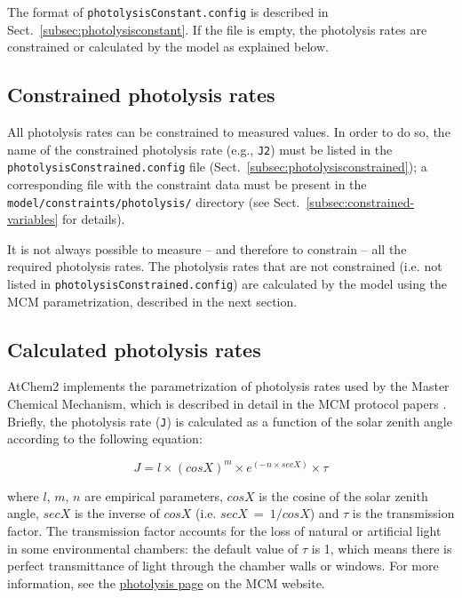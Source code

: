 The format of \texttt{photolysisConstant.config} is described in
Sect.~\ref{subsec:photolysisconstant}. If the file is empty, the
photolysis rates are constrained or calculated by the model as
explained below.

\subsection{Constrained photolysis rates} \label{subsec:constrained-photolysis-rates}

All photolysis rates can be constrained to measured values. In order
to do so, the name of the constrained photolysis rate (e.g., \texttt{J2})
must be listed in the \texttt{photolysisConstrained.config} file
(Sect.~\ref{subsec:photolysisconstrained}); a corresponding file with the
constraint data must be present in the \texttt{model/constraints/photolysis/}
directory (see Sect.~\ref{subsec:constrained-variables} for details).

It is not always possible to measure -- and therefore to constrain --
all the required photolysis rates. The photolysis rates that are not
constrained (i.e. not listed in \texttt{photolysisConstrained.config})
are calculated by the model using the MCM parametrization, described
in the next section.

\subsection{Calculated photolysis rates} \label{subsec:calculated-photolysis-rates}

AtChem2 implements the parametrization of photolysis rates used by the
Master Chemical Mechanism, which is described in detail in the MCM
protocol papers \citep{jenkin_1997, saunders_2003}. Briefly, the
photolysis rate (\texttt{J}) is calculated as a function of the solar
zenith angle according to the following equation:

\begin{equation}
  J = l \times (cosX)^m \times e^{(-n \times secX)} \times \tau
\end{equation}

where $l$, $m$, $n$ are empirical parameters, $cosX$ is the cosine of
the solar zenith angle, $secX$ is the inverse of $cosX$ (i.e.
$secX\ =\ 1/cosX$) and $\tau$ is the transmission factor. The
transmission factor accounts for the loss of natural or artificial
light in some environmental chambers: the default value of $\tau$ is
1, which means there is perfect transmittance of light through the
chamber walls or windows. For more information, see the
\href{https://mcm.york.ac.uk/MCM/rates/photolysis}{photolysis page}
on the MCM website.

